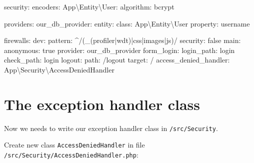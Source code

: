 \documentclass[a4paperpaper,openright]{book}
\newenvironment{Shaded}{}{}
\newcommand{\AttributeTok}[1]{\textcolor[rgb]{0.49,0.56,0.16}{#1}}
\newcommand{\CharTok}[1]{\textcolor[rgb]{0.25,0.44,0.63}{#1}}
\newcommand{\FunctionTok}[1]{\textcolor[rgb]{0.02,0.16,0.49}{#1}}
\begin{document}
\begin{Shaded}
\begin{Highlighting}[]
\FunctionTok{security:}
    \FunctionTok{encoders:}
        \FunctionTok{App\textbackslash{}Entity\textbackslash{}User:}
            \FunctionTok{algorithm:}\AttributeTok{ bcrypt}

    \FunctionTok{providers:}
        \FunctionTok{our_db_provider:}
            \FunctionTok{entity:}
                \FunctionTok{class:}\AttributeTok{ App\textbackslash{}Entity\textbackslash{}User}
                \FunctionTok{property:}\AttributeTok{ username}

    \FunctionTok{firewalls:}
        \FunctionTok{dev:}
            \FunctionTok{pattern:}\AttributeTok{ ^/(_(profiler|wdt)|css|images|js)/}
            \FunctionTok{security:}\AttributeTok{ }\CharTok{false}
        \FunctionTok{main:}
            \FunctionTok{anonymous:}\AttributeTok{ }\CharTok{true}
            \FunctionTok{provider:}\AttributeTok{ our_db_provider}
            \FunctionTok{form_login:}
                \FunctionTok{login_path:}\AttributeTok{ login}
                \FunctionTok{check_path:}\AttributeTok{ login}
            \FunctionTok{logout:}
                \FunctionTok{path:}\AttributeTok{   /logout}
                \FunctionTok{target:}\AttributeTok{ /}
            \FunctionTok{access_denied_handler:}\AttributeTok{ App\textbackslash{}Security\textbackslash{}AccessDeniedHandler}
\end{Highlighting}
\end{Shaded}

\hypertarget{the-exception-handler-class}{%
\section{The exception handler
class}\label{the-exception-handler-class}}

Now we needs to write our exception handler class in
\texttt{/src/Security}.

Create new class \texttt{AccessDeniedHandler} in file
\texttt{/src/Security/AccessDeniedHandler.php}:
\end{document}

